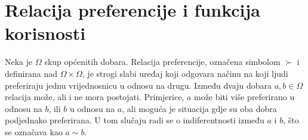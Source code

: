 \documentclass[lmodern, utf8, diplomski, numeric]{fer}
\begin{document}

  \section{Relacija preferencije i funkcija korisnosti}
  Neka je $\Omega$ skup općenitih dobara.
  Relacija preferencije, označena simbolom $\succ$ i definirana nad $\Omega \times \Omega$, je strogi slabi uređaj koji odgovara načinu na koji ljudi preferiraju jednu vrijednosnicu u odnosu na drugu.
  Između dvaju dobara $a, b \in \Omega$ relacija može, ali i ne mora postojati.
  Primjerice, $a$ može biti više preferirano u odnosu na $b$, ili $b$ u odnosu na $a$, ali moguća je situacija gdje su oba dobra podjednako preferirana.
  U tom slučaju radi se o indiferentnosti između $a$ i $b$, što se označava kao $a \sim b$.
\end{document}
